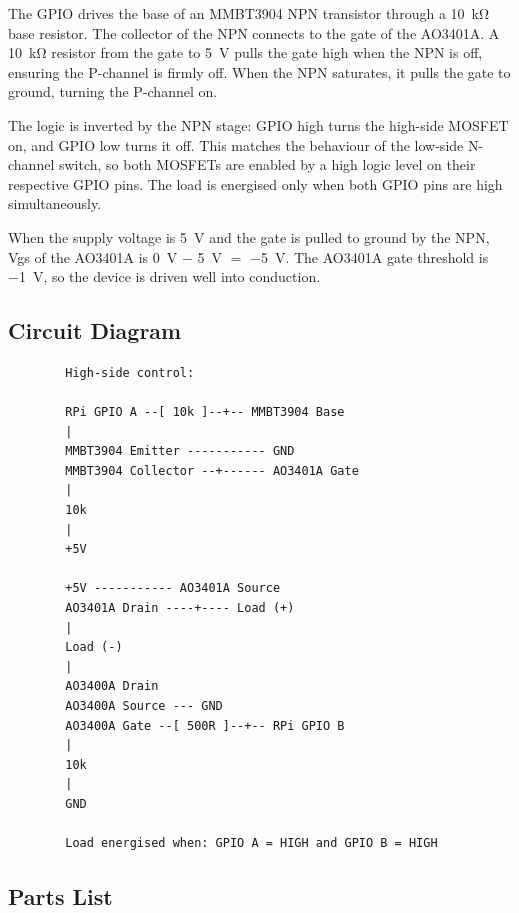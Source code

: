\documentclass[12pt,letterpaper]{article}
\begin{document}
	The GPIO drives the base of an MMBT3904 NPN transistor through a \SI{10}{\kilo\ohm}
	base resistor. The collector of the NPN connects to the gate of the AO3401A. A
	\SI{10}{\kilo\ohm} resistor from the gate to \SI{+5}{\volt} pulls the gate high
	when the NPN is off, ensuring the P-channel is firmly off. When the NPN saturates,
	it pulls the gate to ground, turning the P-channel on.
	
	The logic is inverted by the NPN stage: GPIO high turns the high-side MOSFET on,
	and GPIO low turns it off. This matches the behaviour of the low-side N-channel
	switch, so both MOSFETs are enabled by a high logic level on their respective GPIO
	pins. The load is energised only when both GPIO pins are high simultaneously.
	
	When the supply voltage is \SI{5}{\volt} and the gate is pulled to ground by the NPN,
	Vgs of the AO3401A is \SI{0}{\volt} $-$ \SI{5}{\volt} $=$ \SI{-5}{\volt}. The
	AO3401A gate threshold is \SI{-1}{\volt}, so the device is driven well into
	conduction.
	
	\subsection{Circuit Diagram}
	
	\begin{verbatim}
		High-side control:
		
		RPi GPIO A --[ 10k ]--+-- MMBT3904 Base
		|
		MMBT3904 Emitter ----------- GND
		MMBT3904 Collector --+------ AO3401A Gate
		|
		10k
		|
		+5V
		
		+5V ----------- AO3401A Source
		AO3401A Drain ----+---- Load (+)
		|
		Load (-)
		|
		AO3400A Drain
		AO3400A Source --- GND
		AO3400A Gate --[ 500R ]--+-- RPi GPIO B
		|
		10k
		|
		GND
		
		Load energised when: GPIO A = HIGH and GPIO B = HIGH
	\end{verbatim}
	
	\subsection{Parts List}
	
\end{document}
